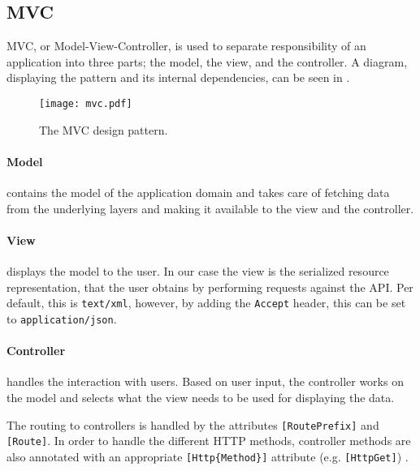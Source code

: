 \subsection{MVC} 
MVC, or Model-View-Controller\cite{aspmvc}, is used to separate responsibility of an application into three parts; the model, the view, and the controller.
A diagram, displaying the pattern and its internal dependencies, can be seen in .

\begin{figure}[h]
\begin{center}
\texttt{[image: mvc.pdf]}
\caption{The MVC design pattern.}
\label{mvcdiagram}
\end{center}
\end{figure}

\paragraph{Model} contains the model of the application domain and takes care of fetching data from the underlying layers and making it available to the view and the controller.

\paragraph{View} displays the model to the user.
In our case the view is the serialized resource representation, that the user obtains by performing requests against the API.
Per default, this is \texttt{text/xml}, however, by adding the \texttt{Accept} header\cite[Section 14]{http_specification}, this can be set to \texttt{application/json}.

\paragraph{Controller} handles the interaction with users.
Based on user input, the controller works on the model and selects what the view needs to be used for displaying the data.

The routing to controllers is handled by the attributes \texttt{[RoutePrefix]} and \texttt{[Route]}.
In order to handle the different HTTP methods, controller methods are also annotated with an appropriate \texttt{[Http\{Method\}]} attribute (e.g. \texttt{[HttpGet]}) \cite{asp_routing}.

